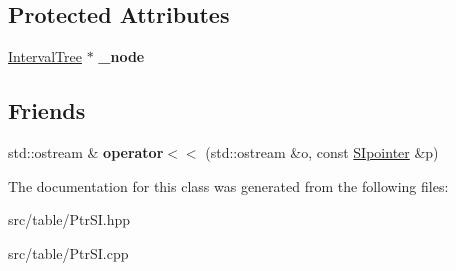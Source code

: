 \subsection*{Protected Attributes}
\begin{DoxyCompactItemize}
\item 
\mbox{\label{classSIpointer_ad623e07df03b58eced4ceaf0855f5993}} 
\mbox{\hyperlink{classIntervalTree}{Interval\+Tree}} $\ast$ {\bfseries \+\_\+node}
\end{DoxyCompactItemize}
\subsection*{Friends}
\begin{DoxyCompactItemize}
\item 
\mbox{\label{classSIpointer_a86a37eaf8509fee42b0cecf04740db9b}} 
std\+::ostream \& {\bfseries operator$<$$<$} (std\+::ostream \&o, const \mbox{\hyperlink{classSIpointer}{S\+Ipointer}} \&p)
\end{DoxyCompactItemize}


The documentation for this class was generated from the following files\+:\begin{DoxyCompactItemize}
\item 
src/table/Ptr\+S\+I.\+hpp\item 
src/table/Ptr\+S\+I.\+cpp\end{DoxyCompactItemize}
